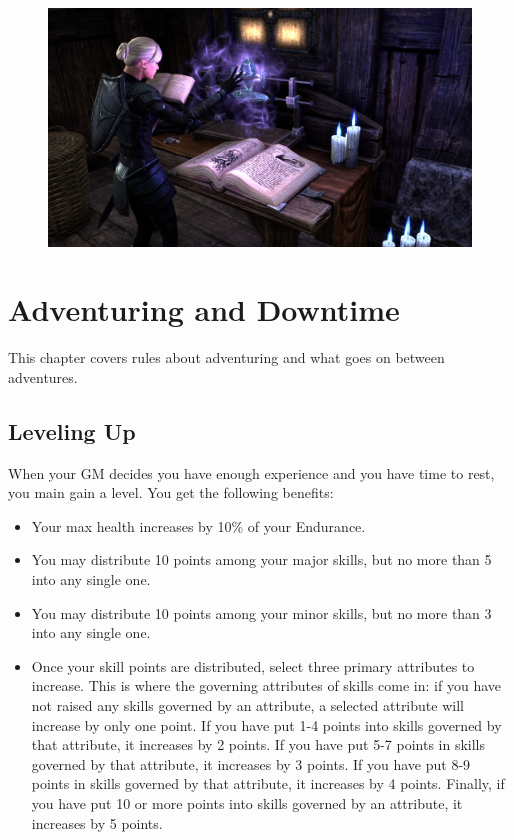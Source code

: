 \documentclass[12pt]{book}
\begin{document}
\begin{figure}
	\includegraphics[width=\textwidth]{Enchanting.png}
\end{figure}

\chapter{Adventuring and Downtime}
This chapter covers rules about adventuring and what goes on between adventures.

\section{Leveling Up}
When your GM decides you have enough experience and you have time to rest, you main gain a level. You get the following benefits:

\begin{itemize}
	\item Your max health increases by 10\% of your Endurance.
	\item You may distribute 10 points among your major skills, but no more than 5 into any single one.
	\item You may distribute 10 points among your minor skills, but no more than 3 into any single one.
	\item Once your skill points are distributed, select three primary attributes to increase. This is where the governing attributes of skills come in: if you have not raised any skills governed by an attribute, a selected attribute will increase by only one point. If you have put 1-4 points into skills governed by that attribute, it increases by 2 points. If you have put 5-7 points in skills governed by that attribute, it increases by 3 points. If you have put 8-9 points in skills governed by that attribute, it increases by 4 points. Finally, if you have put 10 or more points into skills governed by an attribute, it increases by 5 points.
\end{itemize}
\end{document}
